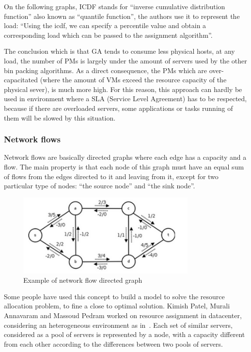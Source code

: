 \documentclass[a4paper,11pt]{article}
\begin{document}
On the following graphs, ICDF stands for “inverse cumulative distribution
function” also known as “quantile function”, the authors use it to represent
the load: “Using the icdf, we can specify a percentile value and obtain a
corresponding load which can be passed to the assignment algorithm”.

The conclusion which is that GA tends to consume less physical hosts, at any
load, the number of PMs is largely under the amount of servers used by the
other bin packing algorithms. As a direct consequence, the PMs which are
over-capacitated (where the amount of VMs exceed the resource capacity of the
physical sever), is much more high. For this reason, this approach can hardly
be used in environment where a SLA (Service Level Agreement) has to be
respected, because if there are overloaded servers, some applications or tasks
running of them will be slowed by this situation.

\subsubsection{Network flows}

Network flows are basically directed graphs where each edge has a capacity and a flow.
The main property is that each node of this graph must have an equal sum of flows from
the edges directed to it and leaving from it, except for two particular type of nodes:
“the source node” and “the sink node”.

\begin{figure}[H]
\begin{center}
	\includegraphics[width=0.8\textwidth]{./images/examplenetwork.png}
	\caption{Example of network flow directed graph}
\end{center}
\end{figure}

Some people have used this concept to build a model to solve the resource
allocation problem, to fine a close to optimal solution. Kimish Patel, Murali
Annavaram and Massoud Pedram worked on resource assignment in
datacenter\cite{allocation:networkflow}, considering an heterogeneous
environment as in~\cite{allocation:heterogeneous}. Each set of similar servers,
considered as a pool of servers is represented by a node, with a capacity
different from each other according to the differences between two pools of
servers.
\end{document}
